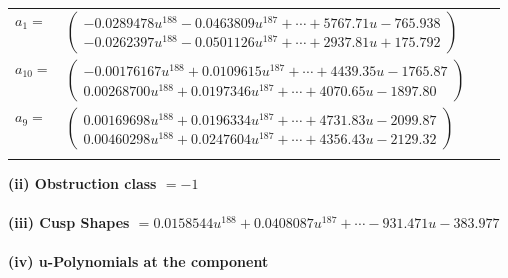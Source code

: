 \documentclass[1p]{elsarticle_modified}
\theoremstyle{definition}
\begin{document}
\begin{tabular}{m{7pt} m{180pt} m{7pt} m{180pt} }
\flushright $a_{1}=$&$\begin{pmatrix}-0.0289478 u^{188}-0.0463809 u^{187}+\cdots+5767.71 u-765.938\\-0.0262397 u^{188}-0.0501126 u^{187}+\cdots+2937.81 u+175.792\end{pmatrix}$ \\
\flushright $a_{10}=$&$\begin{pmatrix}-0.00176167 u^{188}+0.0109615 u^{187}+\cdots+4439.35 u-1765.87\\0.00268700 u^{188}+0.0197346 u^{187}+\cdots+4070.65 u-1897.80\end{pmatrix}$ \\
\flushright $a_{9}=$&$\begin{pmatrix}0.00169698 u^{188}+0.0196334 u^{187}+\cdots+4731.83 u-2099.87\\0.00460298 u^{188}+0.0247604 u^{187}+\cdots+4356.43 u-2129.32\end{pmatrix}$\\&\end{tabular}
\flushleft \textbf{(ii) Obstruction class $= -1$}\\~\\
\flushleft \textbf{(iii) Cusp Shapes $= 0.0158544 u^{188}+0.0408087 u^{187}+\cdots-931.471 u-383.977$}\\~\\
\newpage\renewcommand{\arraystretch}{1}
\flushleft \textbf{(iv) u-Polynomials at the component}\newline \\
\end{document}
